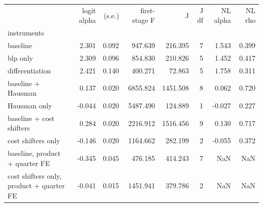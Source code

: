 \begin{tabular}{lrrrrrrr}
\toprule
 & logit alpha & (s.e.) & first-stage F & J & J df & NL alpha & NL rho \\
instruments &  &  &  &  &  &  &  \\
\midrule
baseline & 2.301 & 0.092 & 947.639 & 216.395 & 7 & 1.543 & 0.399 \\
blp only & 2.309 & 0.096 & 854.830 & 210.826 & 5 & 1.452 & 0.417 \\
differentiation & 2.421 & 0.140 & 400.271 & 72.863 & 5 & 1.758 & 0.311 \\
baseline + Hausman & 0.137 & 0.020 & 6855.824 & 1451.508 & 8 & 0.062 & 0.720 \\
Hausman only & -0.044 & 0.020 & 5487.490 & 124.889 & 1 & -0.027 & 0.227 \\
baseline + cost shifters & 0.284 & 0.020 & 2216.912 & 1516.456 & 9 & 0.130 & 0.717 \\
cost shifters only & -0.146 & 0.020 & 1164.662 & 282.199 & 2 & -0.055 & 0.372 \\
baseline, product + quarter FE & -0.345 & 0.045 & 476.185 & 414.243 & 7 & NaN & NaN \\
cost shifters only, product + quarter FE & -0.041 & 0.015 & 1451.941 & 379.786 & 2 & NaN & NaN \\
\bottomrule
\end{tabular}
\par\vspace{2pt}{\footnotesize Price sensitivity $\alpha$ (utility per \$100; positive means downward-sloping demand), route-clustered s.e., first-stage Wald F for price, Hansen J. Columns NL: nested logit with one air-travel nest. Route, quarter and carrier fixed effects unless stated.}
